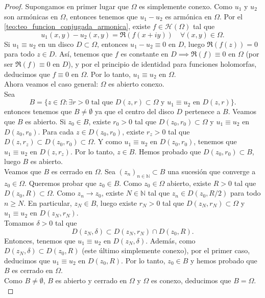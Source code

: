\begin{proof}
    Supongamos en primer lugar que $\Omega$ es simplemente conexo. Como $u_1$ y $u_2$ son armónicas en $\Omega$, entonces tenemos que $u_1 - u_2$ es armónica en $\Omega$. Por el \cref{teo:teo_funcion_conjugada_armonica}, existe $f \in \mathcal{H}(\Omega)$ tal que
    \[
        u_1(x,y) - u_2(x,y) = \Re(f(x+iy)) \quad \forall (x,y) \in \Omega.
    \]
    Si $u_1 \equiv u_2$ en un disco $D \subset \Omega$, entonces $u_1-u_2 \equiv 0$ en $D$, luego $\Re(f(z)) = 0$ para todo $z \in D$. Así, tenemos que $f$ es constante en $D \implies \Re(f) \equiv 0$ en $\Omega$ (por ser $\Re(f) \equiv 0$ en $D$), y por el principio de identidad para funciones holomorfas, deducimos que $f \equiv 0$ en $\Omega$. Por lo tanto, $u_1 \equiv u_2$ en $\Omega$.\\
    Ahora veamos el caso general: $\Omega$ es abierto conexo.\\
    Sea 
    \[
        B = \{z \in \Omega : \exists r > 0 \text{ tal que } D(z,r) \subset \Omega \text{ y } u_1 \equiv u_2 \text{ en } D(z,r)\}.
    \]
    entonces tenemos que $B \neq \emptyset$ ya que el centro del disco $D$ pertenece a $B$. Veamos que $B$ es abierto. Si $z_0 \in B$, existe $r_0 > 0$ tal que $D(z_0,r_0) \subset \Omega$ y $u_1 \equiv u_2$ en $D(z_0,r_0)$. Para cada $z \in D(z_0,r_0)$, existe $r_z > 0$ tal que $D(z,r_z) \subset D(z_0,r_0) \subset \Omega$. Y como $u_1 \equiv u_2$ en $D(z_0,r_0)$, tenemos que $u_1 \equiv u_2$ en $D(z,r_z)$. Por lo tanto, $z \in B$. Hemos probado que $D(z_0,r_0) \subset B$, luego $B$ es abierto.\\
    Veamos que $B$ es cerrado en $\Omega$. Sea $(z_n)_{n \in \mathbb{N}} \subset B$ una sucesión que converge a $z_0 \in \Omega$. Queremos probar que $z_0 \in B$. Como $z_0 \in \Omega$ abierto, existe $R > 0$ tal que $D(z_0,R) \subset \Omega$. Como $z_n \to z_0$, existe $N \in \mathbb{N}$ tal que $z_n \in D(z_0,R/2)$ para todo $n \geq N$. En particular, $z_N \in B$, luego existe $r_N > 0$ tal que $D(z_N,r_N) \subset \Omega$ y $u_1 \equiv u_2$ en $D(z_N,r_N)$.\\
    Tomamos $\delta > 0$ tal que
    \[
        D(z_N,\delta) \subset D(z_N,r_N) \cap D(z_0,R).
    \]
    Entonces, tenemos que $u_1 \equiv u_2$ en $D(z_N,\delta)$. Además, como $D(z_N,\delta) \subset D(z_0,R)$ (este último simplemente conexo), por el primer caso, deducimos que $u_1 \equiv u_2$ en $D(z_0,R)$. Por lo tanto, $z_0 \in B$ y hemos probado que $B$ es cerrado en $\Omega$.\\
    Como $B \neq \emptyset$, $B$ es abierto y cerrado en $\Omega$ y $\Omega$ es conexo, deducimos que $B = \Omega$.\\

\end{proof}
